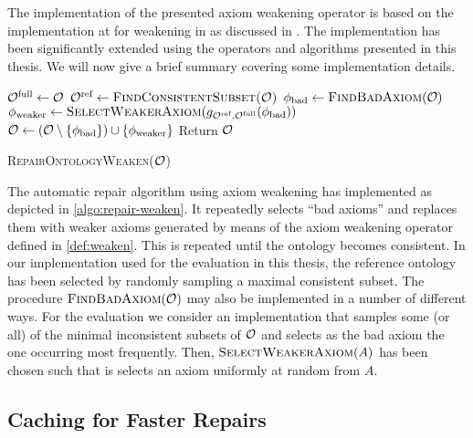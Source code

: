 
The implementation of the presented axiom weakening operator is based on the implementation at \cite{ontologyutils} for weakening in \ALC as discussed in \cite{troquard2018repairing}. The implementation has been significantly extended using the operators and algorithms presented in this thesis. We will now give a brief summary covering some implementation details.

\begin{algorithm}[ht]
  \begin{algorithmic}
    \State ${\mathcal{O}^\textnormal{full}} \gets \mathcal{O}$
    \State ${\mathcal{O}^\textnormal{ref}} \gets \textsc{FindConsistentSubset(\ensuremath{\mathcal{O}})}$
    \State $\phi_\textnormal{bad} \gets \textsc{FindBadAxiom}(\mathcal{O})$
    \State $\phi_\textnormal{weaker} \gets \textsc{SelectWeakerAxiom}(g_{{\mathcal{O}^\textnormal{ref}},{\mathcal{O}^\textnormal{full}}}(\phi_\textnormal{bad}))$
    \State $\mathcal{O} \gets (\mathcal{O} \setminus \{\phi_\textnormal{bad}\}) \cup \{\phi_\textnormal{weaker}\}$
    \EndWhile
    \State Return $\mathcal{O}$
  \end{algorithmic}
  \caption{\textsc{RepairOntologyWeaken}($\mathcal{O}$)}
  \label{algo:repair-weaken}
\end{algorithm}

The automatic repair algorithm using axiom weakening has implemented as depicted in \cref{algo:repair-weaken}. It repeatedly selects ``bad axioms'' and replaces them with weaker axioms generated by means of the axiom weakening operator defined in \cref{def:weaken}. This is repeated until the ontology becomes consistent. In our implementation used for the evaluation in this thesis, the reference ontology has been selected by randomly sampling a maximal consistent subset. The procedure $\textsc{FindBadAxiom}(\mathcal{O})$ may also be implemented in a number of different ways. For the evaluation we consider an implementation that samples some (or all) of the minimal inconsistent subsets of $\mathcal{O}$ and selects as the bad axiom the one occurring most frequently. Then, $\textsc{SelectWeakerAxiom}(A)$ has been chosen such that is selects an axiom uniformly at random from $A$.

\subsection{Caching for Faster Repairs}\label{cache-impl}

